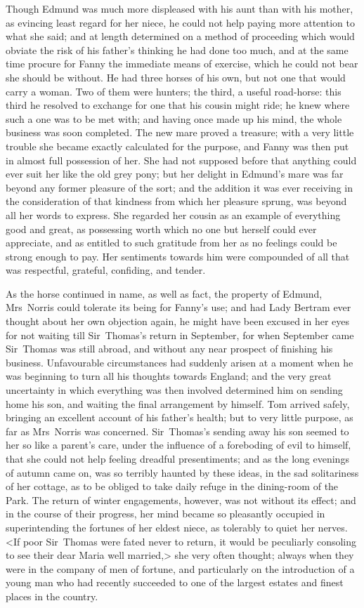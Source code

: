Though Edmund was much more displeased with his aunt than with his mother, as evincing least regard for her niece, he could not help paying more attention to what she said; and at length determined on a method of proceeding which would obviate the risk of his father's thinking he had done too much, and at the same time procure for Fanny the immediate means of exercise, which he could not bear she should be without. He had three horses of his own, but not one that would carry a woman. Two of them were hunters; the third, a useful road-horse: this third he resolved to exchange for one that his cousin might ride; he knew where such a one was to be met with; and having once made up his mind, the whole business was soon completed. The new mare proved a treasure; with a very little trouble she became exactly calculated for the purpose, and Fanny was then put in almost full possession of her. She had not supposed before that anything could ever suit her like the old grey pony; but her delight in Edmund's mare was far beyond any former pleasure of the sort; and the addition it was ever receiving in the consideration of that kindness from which her pleasure sprung, was beyond all her words to express. She regarded her cousin as an example of everything good and great, as possessing worth which no one but herself could ever appreciate, and as entitled to such gratitude from her as no feelings could be strong enough to pay. Her sentiments towards him were compounded of all that was respectful, grateful, confiding, and tender.

As the horse continued in name, as well as fact, the property of Edmund, Mrs~Norris could tolerate its being for Fanny's use; and had Lady Bertram ever thought about her own objection again, he might have been excused in her eyes for not waiting till Sir~Thomas's return in September, for when September came Sir~Thomas was still abroad, and without any near prospect of finishing his business. Unfavourable circumstances had suddenly arisen at a moment when he was beginning to turn all his thoughts towards England; and the very great uncertainty in which everything was then involved determined him on sending home his son, and waiting the final arrangement by himself. Tom arrived safely, bringing an excellent account of his father's health; but to very little purpose, as far as Mrs~Norris was concerned. Sir~Thomas's sending away his son seemed to her so like a parent's care, under the influence of a foreboding of evil to himself, that she could not help feeling dreadful presentiments; and as the long evenings of autumn came on, was so terribly haunted by these ideas, in the sad solitariness of her cottage, as to be obliged to take daily refuge in the dining-room of the Park. The return of winter engagements, however, was not without its effect; and in the course of their progress, her mind became so pleasantly occupied in superintending the fortunes of her eldest niece, as tolerably to quiet her nerves. <If poor Sir~Thomas were fated never to return, it would be peculiarly consoling to see their dear Maria well married,> she very often thought; always when they were in the company of men of fortune, and particularly on the introduction of a young man who had recently succeeded to one of the largest estates and finest places in the country.

